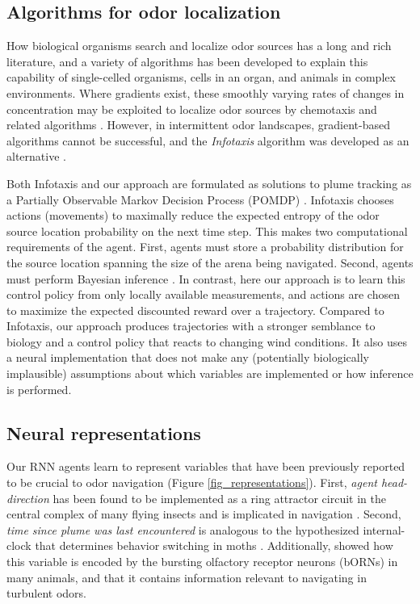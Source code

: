 \documentclass[5p,twocolumn,authoryear]{elsarticle}
\begin{document}
\subsection*{Algorithms for odor localization}
How biological organisms search and localize odor sources has a long and rich literature, and a variety of algorithms has been developed to explain this capability of single-celled organisms, cells in an organ, and animals in complex environments.
Where gradients exist, these smoothly varying rates of changes in concentration may be exploited to localize odor sources by chemotaxis and related algorithms \citep{adler1966chemotaxis,friedrich2007chemotaxis,cremer2019chemotaxis}.
However, in intermittent odor landscapes, gradient-based algorithms cannot be successful, and the \emph{Infotaxis} algorithm was developed as an alternative \citep{balkovsky2002olfactory,vergassola2007infotaxis,masson2009chasing,barbieri2011trajectories,calhoun2014maximally}. 

Both Infotaxis \citep{vergassola2007infotaxis} and our approach are formulated as solutions to plume tracking as a Partially Observable Markov Decision Process (POMDP) \citep{sutton2018reinforcement}. 
Infotaxis chooses actions (movements) to maximally reduce the expected entropy of the odor source location probability on the next time step.
This makes two computational requirements of the agent.
First, agents must store a probability distribution for the source location spanning the size of the arena being navigated.
Second, agents must perform Bayesian inference \citep{reddyannrev}.
In contrast, here our approach is to learn this control policy from only locally available measurements, and actions are chosen to maximize the expected discounted reward over a trajectory.
Compared to Infotaxis, our approach produces trajectories with a stronger semblance to biology and a control policy that reacts to changing wind conditions.
It also uses a neural implementation that does not make any (potentially biologically implausible) assumptions about which variables are implemented or how inference is performed.


\subsection*{Neural representations}
Our RNN agents learn to represent variables that have been previously reported to be crucial to odor navigation (Figure \ref{fig_representations}).
First, \textit{agent head-direction} has been found to be implemented as a ring attractor circuit in the central complex of many flying insects and is implicated in navigation \citep{pfeiffer2014organization,seelig2015neural,green2017neural,kim2019generation,okubo2020neural}.
Second, \textit{time since plume was last encountered}
is analogous to the hypothesized internal-clock that determines behavior switching in moths \citep{kennedy1974pheromone,kennedy1983zigzagging,baker1990upwind}.
Additionally, \cite{park2016neurally} showed how this variable is encoded by the bursting olfactory receptor neurons (bORNs) in many animals, and that it contains information relevant to navigating in turbulent odors.
\end{document}
